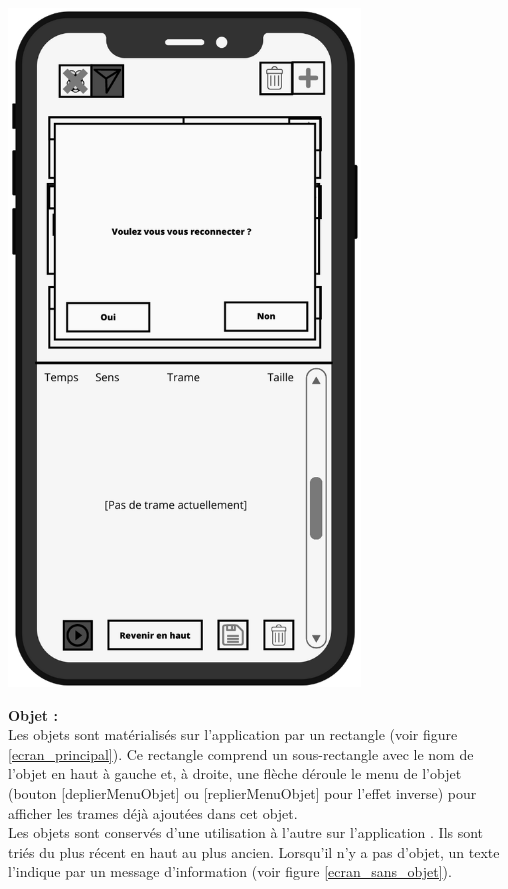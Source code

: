 \begin{minipage}{0.5\linewidth}
    \centering
    \includegraphics[width=0.7\textwidth]{sections/3_Exigences_specifiques/1_IHM/ihm/ecranReconnexion.png}
    \captionsetup{justification=centering}
    \label{ecran_principal_demande_reconnexion}
\end{minipage}

\newpage
\textbf{Objet : } \\
\newline
Les objets sont matérialisés sur l'application {\nomApplication} par un rectangle (voir figure \ref{ecran_principal}). Ce rectangle comprend un sous-rectangle avec le nom de l'objet en haut à gauche et, à droite, une flèche déroule le menu de l'objet (bouton [deplierMenuObjet] ou [replierMenuObjet] pour l'effet inverse) pour afficher les trames déjà ajoutées dans cet objet. \newline \\
Les objets sont conservés d'une utilisation à l'autre sur l'application {\nomApplication}. Ils sont triés du plus récent en haut au plus ancien.
Lorsqu'il n'y a pas d'objet, un texte l'indique par un message d'information (voir figure \ref{ecran_sans_objet}). 
\vspace{0.5cm}

